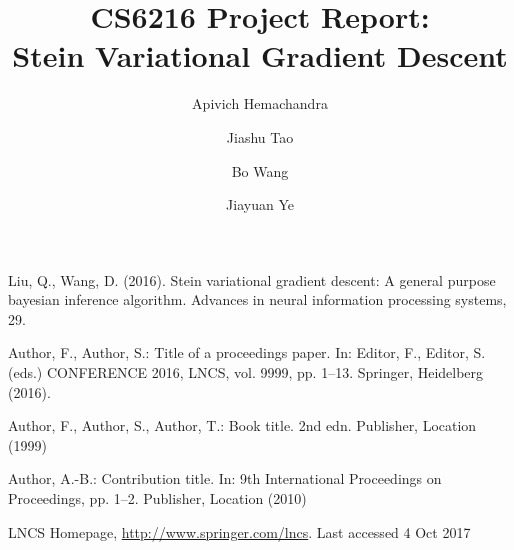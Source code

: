 \documentclass[runningheads]{llncs}
\begin{document}
%
\title{CS6216 Project Report: \\Stein Variational Gradient Descent}
%
%
\author{Apivich Hemachandra \and
Jiashu Tao \and
Bo Wang   \and
Jiayuan Ye }
%
%

\maketitle              %
%








%
%
%
% 
% 
%
\begin{thebibliography}{8}
Liu, Q., Wang, D. (2016). Stein variational gradient descent: A general purpose bayesian inference algorithm. Advances in neural information processing systems, 29.

Author, F., Author, S.: Title of a proceedings paper. In: Editor,
F., Editor, S. (eds.) CONFERENCE 2016, LNCS, vol. 9999, pp. 1--13.
Springer, Heidelberg (2016). 

Author, F., Author, S., Author, T.: Book title. 2nd edn. Publisher,
Location (1999)

Author, A.-B.: Contribution title. In: 9th International Proceedings
on Proceedings, pp. 1--2. Publisher, Location (2010)

LNCS Homepage, \url{http://www.springer.com/lncs}. Last accessed 4
Oct 2017
\end{thebibliography}
\end{document}
